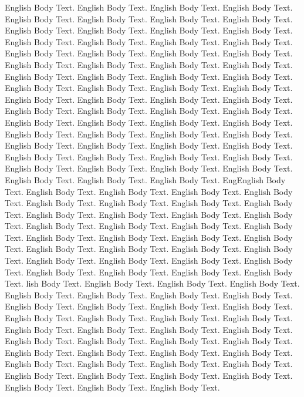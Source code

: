 \documentclass{jsarticle}
\begin{document}
English Body Text. English Body Text. English Body Text. English Body
Text. English Body Text. English Body Text. English Body Text. English
Body Text. English Body Text. English Body Text. English Body
Text. English Body Text. English Body Text. English Body Text. English
Body Text. English Body Text. English Body Text. English Body
Text. English Body Text. English Body Text. English Body Text. English
Body Text. English Body Text. English Body Text. English Body
Text. English Body Text. English Body Text. English Body Text. English
Body Text. English Body Text. English Body Text. English Body
Text. English Body Text. English Body Text. English Body Text. English
Body Text. English Body Text. English Body Text. English Body
Text. English Body Text. English Body Text. English Body Text. English
Body Text. English Body Text. English Body Text. English Body
Text. English Body Text. English Body Text. English Body Text. English
Body Text. English Body Text. English Body Text. English Body
Text. English Body Text. English Body Text. English Body Text. English
Body Text. English Body Text. English Body Text. English Body
Text. English Body Text. English Body Text. English Body
Text. EngEnglish Body Text. English Body Text. English Body
Text. English Body Text. English Body Text. English Body Text. English
Body Text. English Body Text. English Body Text. English Body
Text. English Body Text. English Body Text. English Body Text. English
Body Text. English Body Text. English Body Text. English Body
Text. English Body Text. English Body Text. English Body Text. English
Body Text. English Body Text. English Body Text. English Body
Text. English Body Text. English Body Text. English Body Text. English
Body Text. English Body Text. English Body Text. English Body
Text. English Body Text. English Body Text. 
lish Body Text. English Body Text. English Body Text. English Body
Text. English Body Text. English Body Text. English Body Text. English
Body Text. English Body Text. English Body Text. English Body
Text. English Body Text. English Body Text. English Body Text. English
Body Text. English Body Text. English Body Text. English Body
Text. English Body Text. English Body Text. English Body Text. English
Body Text. English Body Text. English Body Text. English Body
Text. English Body Text. English Body Text. English Body Text. English
Body Text. English Body Text. English Body Text. English Body
Text. English Body Text. English Body Text. English Body Text. English
Body Text. English Body Text. English Body Text. English Body Text. 
\end{document}
